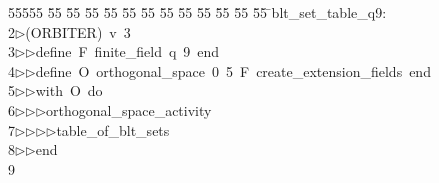 %
%
\begin{tabbing}
55555 \= 55 \= 55 \= 55 \= 55 \= 55 \= 55 \= 55 \= 55 \= 55 \= 55 \= 55 \= 55 \= \>blt\_set\_table\_q9:\ \\[0pt]
2\>$\triangleright$\>(ORBITER)\ v\ 3\ \\[0pt]
3\>$\triangleright$\>$\triangleright$\>define\ F\ finite\_field\ q\ 9\ end\ \\[0pt]
4\>$\triangleright$\>$\triangleright$\>define\ O\ orthogonal\_space\ 0\ 5\ F\ create\_extension\_fields\ end\ \\[0pt]
5\>$\triangleright$\>$\triangleright$\>with\ O\ do\ \\[0pt]
6\>$\triangleright$\>$\triangleright$\>$\triangleright$\>orthogonal\_space\_activity\ \\[0pt]
7\>$\triangleright$\>$\triangleright$\>$\triangleright$\>$\triangleright$\>table\_of\_blt\_sets\ \\[0pt]
8\>$\triangleright$\>$\triangleright$\>end\\[0pt]
9\>\end{tabbing}
